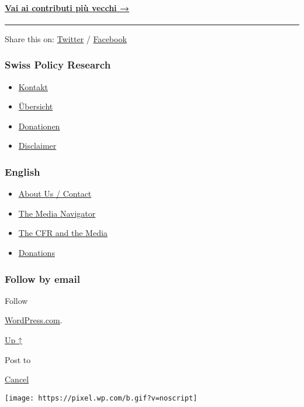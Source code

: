\hypertarget{vai-ai-contributi-piuxf9-vecchi-}{%
\paragraph{\texorpdfstring{\href{https://swprs.org/fatti-su-covid-19-archivio-marzo-2020/}{Vai
ai contributi più vecchi
→}}{Vai ai contributi più vecchi →}}\label{vai-ai-contributi-piuxf9-vecchi-}}

\begin{center}\rule{0.5\linewidth}{\linethickness}\end{center}

Share this on:
\href{https://twitter.com/intent/tweet?url=https://swprs.org/un-medico-svizzero-su-covid-19/}{Twitter}
/
\href{https://www.facebook.com/share.php?u=https://swprs.org/un-medico-svizzero-su-covid-19/}{Facebook}

\hypertarget{swiss-policy-research}{%
\subsubsection{Swiss Policy Research}\label{swiss-policy-research}}

\begin{itemize}
\tightlist
\item
  \href{https://swprs.org/kontakt/}{Kontakt}
\item
  \href{https://swprs.org/uebersicht/}{Übersicht}
\item
  \href{https://swprs.org/donationen/}{Donationen}
\item
  \href{https://swprs.org/disclaimer/}{Disclaimer}
\end{itemize}

\hypertarget{english}{%
\subsubsection{English}\label{english}}

\begin{itemize}
\tightlist
\item
  \href{https://swprs.org/contact/}{About Us / Contact}
\item
  \href{https://swprs.org/media-navigator/}{The Media Navigator}
\item
  \href{https://swprs.org/the-american-empire-and-its-media/}{The CFR
  and the Media}
\item
  \href{https://swprs.org/donations/}{Donations}
\end{itemize}

\hypertarget{follow-by-email}{%
\subsubsection{Follow by email}\label{follow-by-email}}

Follow

\href{https://wordpress.com/?ref=footer_custom_com}{WordPress.com}.

\protect\hyperlink{}{Up ↑}

Post to

\protect\hyperlink{}{Cancel}

\texttt{[image: https://pixel.wp.com/b.gif?v=noscript]}

